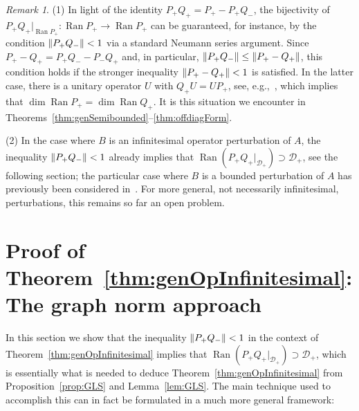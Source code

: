 \documentclass[11pt,a4paper]{amsart}
\numberwithin{equation}{section}
\DeclareMathOperator{\Ran}{Ran}
\DeclarePairedDelimiter{\norm}{\lVert}{\rVert}
\newcommand{\cD}{{\mathcal D}}
\theoremstyle{plain}
\theoremstyle{definition}
\theoremstyle{remark}
\newtheorem{remark}[theorem]{Remark}
\begin{document}
\begin{remark}\label{rem:PQbij}
  (1)
  In light of the identity $P_+Q_+ = P_+ - P_+Q_-$, the bijectivity of $P_+Q_+|_{\Ran P_+} \colon \Ran P_+ \to \Ran P_+$ can be
  guaranteed, for instance, by the condition $\norm{P_+Q_-} < 1$ via a standard Neumann series argument. Since
  $P_+-Q_+=P_+Q_- - P_-Q_+$ and, in particular, $\norm{P_+Q_-}\le\norm{P_+-Q_+}$, this condition holds if the stronger inequality
  $\norm{P_+-Q_+}<1$ is satisfied. In the latter case, there is a unitary operator $U$ with $Q_+U=UP_+$, see,
  e.g.,~\cite[Theorem~I.6.32]{Kato95}, which implies that $\dim \Ran P_+=\dim\Ran Q_+$. It is this situation we encounter in
  Theorems~\ref{thm:genSemibounded}--\ref{thm:offdiagForm}.
 
  (2)
  In the case where $B$ is an infinitesimal operator perturbation of $A$, the inequality $\norm{P_+Q_-}<1$ already implies that
  $\Ran(P_+Q_+|_{\cD_+}) \supset \cD_+$, see the following section; the particular case where $B$ is a bounded perturbation of
  $A$ has previously been considered in~\cite[Lemma~A.6]{NSTTV18}. For more general, not necessarily infinitesimal,
  perturbations, this remains so far an open problem.
\end{remark}

\section{Proof of Theorem~\ref{thm:genOpInfinitesimal}: The graph norm approach}\label{sec:graphNorm}

In this section we show that the inequality $\norm{P_+Q_-} < 1$ in the context of Theorem~\ref{thm:genOpInfinitesimal} implies
that $\Ran(P_+Q_+|_{\cD_+}) \supset \cD_+$, which is essentially what is needed to deduce Theorem~\ref{thm:genOpInfinitesimal}
from Proposition~\ref{prop:GLS} and Lemma~\ref{lem:GLS}. The main technique used to accomplish this can in fact be formulated in
a much more general framework:
\end{document}
